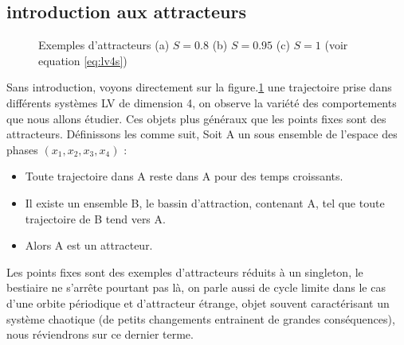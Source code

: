 \documentclass{wsdcr}
\begin{document}
\subsection{introduction aux attracteurs}
\begin{figure}
    \centering
    \caption{Exemples d'attracteurs (a) $S=0.8$ (b) $S=0.95$ (c) $S=1$ (voir equation \ref{eq:lv4s})}
    \label{fig:exemple}
\end{figure}
Sans introduction, voyons directement sur la figure.\ref{fig:exemple} une trajectoire prise dans différents systèmes LV de dimension 4, on observe la variété des comportements que nous allons étudier. Ces objets plus généraux que les points fixes sont des attracteurs. Définissons les comme suit, Soit A un sous ensemble de l'espace des phases $(x_1,x_2,x_3,x_4)$ :
\begin{itemize}
	\item Toute trajectoire dans A reste dans A pour des temps croissants.
	\item Il existe un ensemble B, le bassin d'attraction, contenant A, tel que toute trajectoire de B tend vers A.
	\item Alors A est un attracteur.
\end{itemize}
Les points fixes sont des exemples d'attracteurs réduits à un singleton, le bestiaire ne s'arrête pourtant pas là, on parle aussi de cycle limite dans le cas d'une orbite périodique et d'attracteur étrange, objet souvent caractérisant un système chaotique (de petits changements entrainent de grandes conséquences), nous réviendrons sur ce dernier terme. \\
\end{document}
